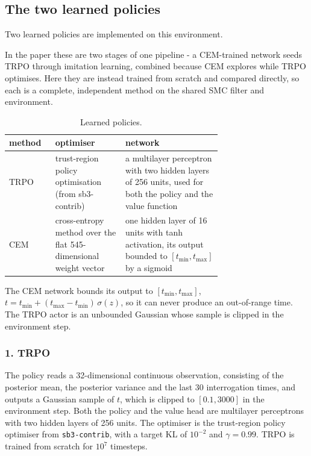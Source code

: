 \documentclass[12pt,a4paper]{article}
\begin{document}
\subsection{The two learned policies}
\label{sec:family-learned}
Two learned policies are implemented on this environment.

In the paper these are two stages of one pipeline - a CEM-trained network seeds TRPO through
imitation learning, combined because CEM explores while TRPO optimises. Here they are instead
trained from scratch and compared directly, so each is a complete, independent method on the
shared SMC filter and environment.

\begin{table}[H]
  \centering
  \caption{Learned policies.}
  \label{tab:learned-policies}
  \footnotesize
  \begin{tabular}{%
    >{\raggedright\arraybackslash}p{0.09\linewidth}%
    >{\raggedright\arraybackslash}p{0.257\linewidth}%
    >{\raggedright\arraybackslash}p{0.357\linewidth}}
  \toprule
  method & optimiser & network \\
  \midrule
  TRPO & trust-region policy optimisation (from sb3-contrib) & a multilayer
  perceptron with two hidden layers of 256 units, used for both the policy and
  the value function \\
  CEM & cross-entropy method over the flat 545-dimensional weight vector & one
  hidden layer of 16 units with tanh activation, its output bounded to
  $[t_{\min}, t_{\max}]$ by a sigmoid \\
  \bottomrule
  \end{tabular}
\end{table}
The CEM network bounds its output to $[t_{\min}, t_{\max}]$, $t = t_{\min} + (t_{\max}-t_{\min})\,\sigma(z)$,
so it can never produce an out-of-range time. The TRPO actor is an unbounded Gaussian whose sample is
clipped in the environment step.

\subsubsection{1. TRPO}
\label{sec:method-trpo}
The policy reads a 32-dimensional continuous observation, consisting of the posterior mean, the
posterior variance and the last 30 interrogation times, and outputs a Gaussian sample of
$t$, which is clipped to $[0.1, 3000]$ in the environment step. Both the policy and the value head
are multilayer perceptrons with two hidden layers of 256 units. The optimiser is the trust-region
policy optimiser from \texttt{sb3-contrib}, with a target KL of $10^{-2}$ and $\gamma = 0.99$. TRPO
is trained from scratch for $10^7$ timesteps.
\end{document}
